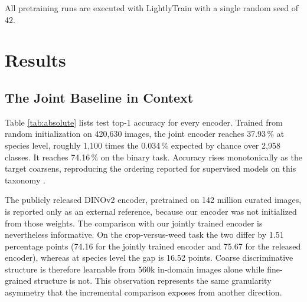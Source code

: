 \documentclass[english]{lni}
\begin{document}
All pretraining runs are executed with LightlyTrain \cite{LightlyTrain2025} with a single random seed of 42.

\section{Results}\label{sec:results}

\subsection{The Joint Baseline in Context}\label{sec:baseline}

Table \ref{tab:absolute} lists test top-1 accuracy for every encoder. Trained from random initialization on 420,630 images, the joint encoder reaches 37.93\,\% at species level, roughly 1,100 times the 0.034\,\% expected by chance over 2,958 classes. It reaches 74.16\,\% on the binary task. Accuracy rises monotonically as the target coarsens, reproducing the ordering reported for supervised models on this taxonomy \cite{Jain2025}.

The publicly released DINOv2 encoder, pretrained on 142 million curated images, is reported only as an external reference, because our encoder was not initialized from those weights. The comparison with our jointly trained encoder is nevertheless informative. On the crop-versus-weed task the two differ by 1.51 percentage points (74.16 for the jointly trained encoder and 75.67 for the released encoder), whereas at species level the gap is 16.52 points. Coarse discriminative structure is therefore learnable from 560k in-domain images alone while fine-grained structure is not. This observation represents the same granularity asymmetry that the incremental comparison exposes from another direction.
\end{document}
